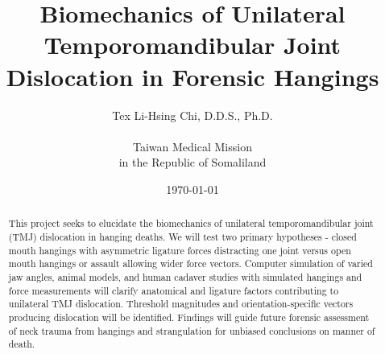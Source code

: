 \documentclass{article}
\title{Biomechanics of Unilateral Temporomandibular Joint Dislocation in Forensic Hangings}
\author{Tex Li-Hsing Chi, D.D.S., Ph.D. \\ \tmu \\ Taiwan Medical Mission \\ in the Republic of Somaliland}
\date{\today}
\begin{document}
\maketitle 

\begin{abstract}
This project seeks to elucidate the biomechanics of unilateral temporomandibular joint (TMJ) dislocation in hanging deaths. We will test two primary hypotheses - closed mouth hangings with asymmetric ligature forces distracting one joint versus open mouth hangings or assault allowing wider force vectors. Computer simulation of varied jaw angles, animal models, and human cadaver studies with simulated hangings and force measurements will clarify anatomical and ligature factors contributing to unilateral TMJ dislocation. Threshold magnitudes and orientation-specific vectors producing dislocation will be identified. Findings will guide future forensic assessment of neck trauma from hangings and strangulation for unbiased conclusions on manner of death.

\end{abstract}


\end{document}
